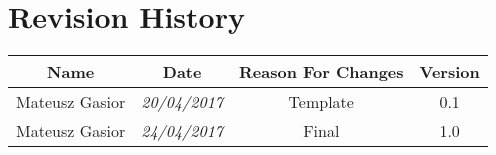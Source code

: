 \chapter*{Revision History}

\begin{center}
    \begin{tabular}{|c|c|c|c|}
        \hline
	    Name & Date & Reason For Changes & Version\\
        \hline
	    Mateusz Gasior & \emph{20/04/2017} & Template & 0.1 \\ \hline
 	    Mateusz Gasior & \emph{24/04/2017} & Final & 1.0 \\ \hline
        \hline
    \end{tabular}
\end{center}